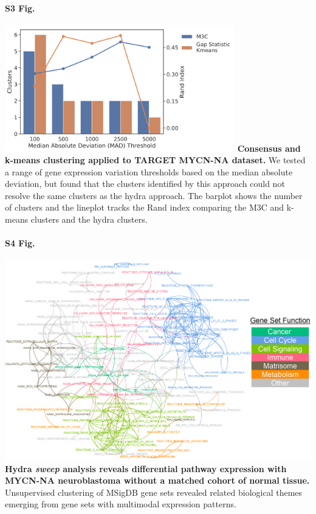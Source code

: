 \documentclass[10pt,letterpaper]{article}
\begin{document}
\paragraph*{S3 Fig.}
\includegraphics[width=0.75\textwidth]{img/PNG/clustering-screen}
\label{S3_Fig}
{\bf{Consensus and k-means clustering applied to TARGET MYCN-NA dataset.}} We tested a range of gene expression variation thresholds based on the median absolute deviation, but found that the clusters identified by this approach could not resolve the same clusters as the hydra approach. The barplot shows the number of clusters and the lineplot tracks the Rand index comparing the M3C and k-means clusters and the hydra clusters.

\paragraph*{S4 Fig.}
\includegraphics[width=\textwidth]{img/PNG/sweep-gene-set-network-V3-2x}
\label{S4_Fig}{\bf Hydra \textit{sweep} analysis reveals differential pathway expression with MYCN-NA neuroblastoma without a matched cohort of normal tissue.} 
Unsupervised clustering of MSigDB gene sets revealed related biological themes emerging from gene sets with multimodal expression patterns.
\end{document}
